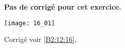 \normalfalse \difficiletrue \tdifficilefalse
\correctionfalse


\setcounter{question}{0}
\ifcorrection
\else
\textbf{Pas de corrigé pour cet exercice.}
\fi

\ifprof
\else
\begin{center}
\texttt{[image: 16\_01]}
\end{center}
\fi


\ifprof
\else
\fi



\ifprof
\else
\begin{flushright}
\footnotesize{Corrigé  voir \ref{B2:12:16}.}
\end{flushright}%
\fi